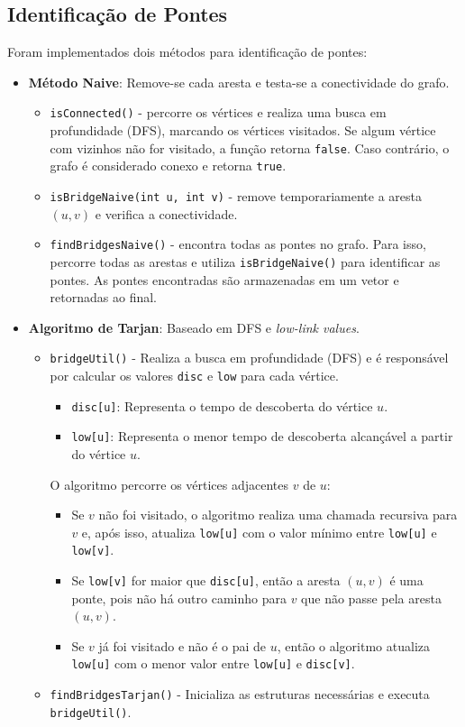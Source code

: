 \documentclass{article}
\begin{document}
\subsection{Identifica\c{c}\~ao de Pontes}
Foram implementados dois m\'etodos para identifica\c{c}\~ao de pontes:

\begin{itemize}
    \item \textbf{Método Naive}: Remove-se cada aresta e testa-se a conectividade do grafo.
    \begin{itemize}
        \item \texttt{isConnected()} - percorre os vértices e realiza uma busca em profundidade (DFS), marcando os vértices visitados. Se algum vértice com vizinhos não for visitado, a função retorna \texttt{false}. Caso contrário, o grafo é considerado conexo e retorna \texttt{true}.
        \item \texttt{isBridgeNaive(int u, int v)} - remove temporariamente a aresta \((u, v)\) e verifica a conectividade.
        \item \texttt{findBridgesNaive()} - encontra todas as pontes no grafo. Para isso, percorre todas as arestas e utiliza \texttt{isBridgeNaive()} para identificar as pontes. As pontes encontradas são armazenadas em um vetor e retornadas ao final.
    \end{itemize}
    \item \textbf{Algoritmo de Tarjan}: Baseado em DFS e \textit{low-link values}.
 \begin{itemize}
    \item \texttt{bridgeUtil()} - Realiza a busca em profundidade (DFS) e é responsável por calcular os valores \texttt{disc} e \texttt{low} para cada vértice. 
    \begin{itemize}
        \item \texttt{disc[u]}: Representa o tempo de descoberta do vértice \(u\).
        \item \texttt{low[u]}: Representa o menor tempo de descoberta alcançável a partir do vértice \(u\).
    \end{itemize}
    O algoritmo percorre os vértices adjacentes \(v\) de \(u\):
    \begin{itemize}
        \item Se \(v\) não foi visitado, o algoritmo realiza uma chamada recursiva para \(v\) e, após isso, atualiza \texttt{low[u]} com o valor mínimo entre \texttt{low[u]} e \texttt{low[v]}.
        \item Se \texttt{low[v]} for maior que \texttt{disc[u]}, então a aresta \((u, v)\) é uma ponte, pois não há outro caminho para \(v\) que não passe pela aresta \((u, v)\).
        \item Se \(v\) já foi visitado e não é o pai de \(u\), então o algoritmo atualiza \texttt{low[u]} com o menor valor entre \texttt{low[u]} e \texttt{disc[v]}.
    \end{itemize}
    \item \texttt{findBridgesTarjan()} - Inicializa as estruturas necessárias e executa \texttt{bridgeUtil()}.
\end{itemize}

\end{itemize}
\end{document}
